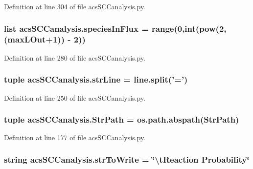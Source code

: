 Definition at line 304 of file acs\-S\-C\-Canalysis.\-py.

\hypertarget{a00096_a36f6b63269e716f42cd38a36a781a4cf}{
\subsubsection[{species\-In\-Flux}]{\setlength{\rightskip}{0pt plus 5cm}list acs\-S\-C\-Canalysis.\-species\-In\-Flux = range(0,int(pow(2,({\bf max\-L\-Out}+1)) -\/ 2))}}\label{a00096_a36f6b63269e716f42cd38a36a781a4cf}


Definition at line 280 of file acs\-S\-C\-Canalysis.\-py.

\hypertarget{a00096_a072631e11db72789389935b0f9efff8d}{
\subsubsection[{str\-Line}]{\setlength{\rightskip}{0pt plus 5cm}tuple acs\-S\-C\-Canalysis.\-str\-Line = {\bf line.\-split}('=')}}\label{a00096_a072631e11db72789389935b0f9efff8d}


Definition at line 250 of file acs\-S\-C\-Canalysis.\-py.

\hypertarget{a00096_af8add8b37a9c8a7825c0e8f0e7dfd6c1}{
\subsubsection[{Str\-Path}]{\setlength{\rightskip}{0pt plus 5cm}tuple acs\-S\-C\-Canalysis.\-Str\-Path = os.\-path.\-abspath(Str\-Path)}}\label{a00096_af8add8b37a9c8a7825c0e8f0e7dfd6c1}


Definition at line 177 of file acs\-S\-C\-Canalysis.\-py.

\hypertarget{a00096_a1966f0657c6b477eeb60bde732a201cc}{
\subsubsection[{str\-To\-Write}]{\setlength{\rightskip}{0pt plus 5cm}string acs\-S\-C\-Canalysis.\-str\-To\-Write = \char`\"{}\textbackslash{}t\-Reaction Probability\char`\"{}}}\label{a00096_a1966f0657c6b477eeb60bde732a201cc}



